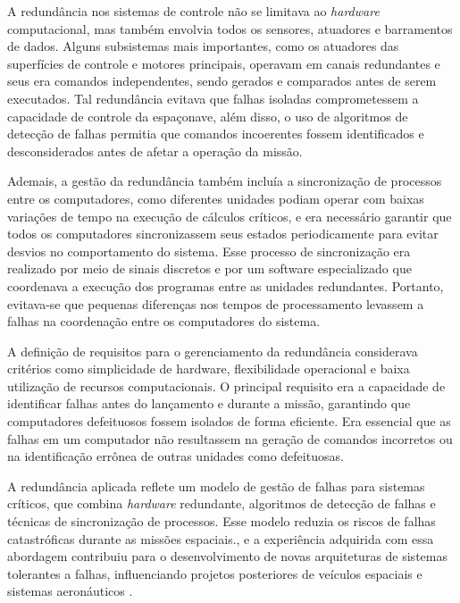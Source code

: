 A redundância nos sistemas de controle não se limitava ao \emph{hardware} computacional, mas também envolvia todos os sensores, atuadores e barramentos de dados.
Alguns subsistemas mais importantes, como os atuadores das superfícies de controle e motores principais, operavam em canais redundantes e seus era comandos independentes, sendo gerados e comparados antes de serem executados. 
Tal redundância evitava que falhas isoladas comprometessem a capacidade de controle da espaçonave, além disso, o uso de algoritmos de detecção de falhas permitia que comandos incoerentes fossem identificados e desconsiderados antes de afetar a operação da missão.

Ademais, a gestão da redundância também incluía a sincronização de processos entre os computadores, como diferentes unidades podiam operar com baixas variações de tempo na execução de cálculos críticos, e era necessário garantir que todos os computadores sincronizassem seus estados periodicamente para evitar desvios no comportamento do sistema.
Esse processo de sincronização era realizado por meio de sinais discretos e por um software especializado que coordenava a execução dos programas entre as unidades redundantes.
Portanto, evitava-se que pequenas diferenças nos tempos de processamento levassem a falhas na coordenação entre os computadores do sistema.

A definição de requisitos para o gerenciamento da redundância considerava critérios como simplicidade de hardware, flexibilidade operacional e baixa utilização de recursos computacionais.
O principal requisito era a capacidade de identificar falhas antes do lançamento e durante a missão, garantindo que computadores defeituosos fossem isolados de forma eficiente.
Era essencial que as falhas em um computador não resultassem na geração de comandos incorretos ou na identificação errônea de outras unidades como defeituosas.

A redundância aplicada reflete um modelo de gestão de falhas para sistemas críticos, que combina \emph{hardware} redundante, algoritmos de detecção de falhas e técnicas de sincronização de processos.
Esse modelo reduzia os riscos de falhas catastróficas durante as missões espaciais., e a experiência adquirida com essa abordagem contribuiu para o desenvolvimento de novas arquiteturas de sistemas tolerantes a falhas, influenciando projetos posteriores de veículos espaciais e sistemas aeronáuticos \cite{sklaroff1976}.